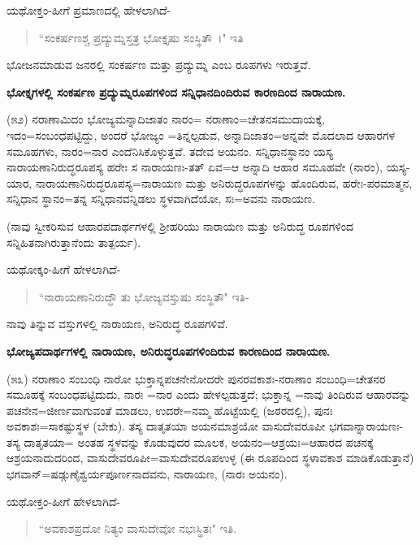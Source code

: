 ಯಥೋಕ್ತಂ-ಹೀಗೆ ಪ್ರಮಾಣದಲ್ಲಿ ಹೇಳಲಾಗಿದೆ-

\begin{verse}
``ಸಂಕರ್ಷಣಶ್ಚ ಪ್ರದ್ಯುಮ್ನಸ್ತತ್ರ ಭೋಕ್ತೃಷು ಸಂಸ್ಥಿತೌ~।" ಇತಿ
\end{verse}

\noindent
ಭೋಜನಮಾಡುವ ಜನರಲ್ಲಿ ಸಂಕರ್ಷಣ ಮತ್ತು ಪ್ರದ್ಯುಮ್ನ ಎಂಬ ರೂಪಗಳು ಇರುತ್ತವೆ.

\begin{center}
\textbf{ಭೋಕ್ತೃಗಳಲ್ಲಿ ಸಂಕರ್ಷಣ ಪ್ರದ್ಯುಮ್ನರೂಪಗಳಿಂದ ಸನ್ನಿಧಾನದಿಂದಿರುವ ಕಾರಣದಿಂದ ನಾರಾಯಣ.}
\end{center}

(೫೨) ನರಾಣಾಮಿದಂ ಭೋಜ್ಯಮನ್ನಾದಿಜಾತಂ ನಾರಂ= ನರಾಣಾಂ=ಚೇತನಸಮುದಾಯಕ್ಕೆ, ಇದಂ=ಸಂಬಂಧಪಟ್ಟಿದ್ದು, ಅಂದರೆ ಭೋಜ್ಯಂ =ತಿನ್ನಲ್ಪಡುವ, ಅನ್ನಾದಿಜಾತಂ=ಅನ್ನವೇ ಮೊದಲಾದ ಆಹಾರಗಳ ಸಮೂಹಗಳು, ನಾರಂ=ನಾರ ಎಂದೆನಿಸಿಕೊಳ್ಳುತ್ತವೆ. ತದೇವ ಅಯನಂ. ಸನ್ನಿಧಾನಸ್ಥಾನಂ ಯಸ್ಯ ನಾರಾಯಣಾನಿರುದ್ಧರೂಪಸ್ಯ ಹರೇಃ ಸ ನಾರಾಯಣಃ-ತತ್ ಏವ=ಆ ಅನ್ನಾದಿ ಆಹಾರ ಸಮೂಹವೇ (ನಾರಂ), ಯಸ್ಯ-ಯಾರ, ನಾರಾಯಣಾನಿರುದ್ಧರೂಪಸ್ಯ=ನಾರಾಯಣ ಮತ್ತು ಅನಿರುದ್ಧರೂಪಗಳನ್ನು ಹೊಂದಿರುವ, ಹರೇಃ-ಪರಮಾತ್ಮನ, ಸನ್ನಿಧಾನ ಸ್ಥಾನಂ=ತನ್ನ ಸನ್ನಿಧಾನವನ್ನಿಡಲು ಸ್ಥಳವಾಗಿದೆಯೋ, ಸಃ=ಅವನು ನಾರಾಯಣ.

(ನಾವು ಸ್ವೀಕರಿಸುವ ಆಹಾರಪದಾರ್ಥಗಳಲ್ಲಿ ಶ‍್ರೀಹರಿಯು ನಾರಾಯಣ ಮತ್ತು ಅನಿರುದ್ಧ ರೂಪಗಳಿಂದ ಸನ್ನಿಹಿತನಾಗಿರುತ್ತಾನೆಂದು ತಾತ್ಪರ್ಯ).

ಯಥೋಕ್ಕಂ-ಹೀಗೆ ಹೇಳಲಾಗಿದೆ-

\begin{verse}
``ನಾರಾಯಣಾನಿರುದ್ಧೌ ತು ಭೋಜ್ಯವಸ್ತುಷು ಸಂಸ್ಥಿತೌ" ಇತಿ-
\end{verse}

\noindent
ನಾವು ತಿನ್ನುವ ವಸ್ತುಗಳಲ್ಲಿ ನಾರಾಯಣ, ಅನಿರುದ್ಧ ರೂಪಗಳಿವೆ.

\begin{center}
\textbf{ಭೋಜ್ಯಪದಾರ್ಥಗಳಲ್ಲಿ ನಾರಾಯಣ, ಅನಿರುದ್ಧರೂಪಗಳಿಂದಿರುವ ಕಾರಣದಿಂದ ನಾರಾಯಣ.}
\end{center}

(೫೩) ನರಾಣಾಂ ಸಂಬಂಧಿ ನಾರೋ ಭುಕ್ತಾನ್ನಪಚನೇನೋದರೇ ಪುನರವಕಾಶಃ-ನರಾಣಾಂ ಸಂಬಂಧಿ=ಚೇತನರ ಸಮೂಹಕ್ಕೆ ಸಂಬಂಧಪಟ್ಟಿದುದು, ನಾರಃ =ನಾರ ಎಂದು ಹೇಳಲ್ಪಡುತ್ತದೆ; ಭುಕ್ತಾನ್ನ =ನಾವು ತಿಂದಿರುವ ಆಹಾರವನ್ನು ಪಚನೇನ=ಜೀರ್ಣವಾಗುವಂತೆ ಮಾಡಲು, ಉದರೇ=ನಮ್ಮ ಹೊಟ್ಟೆಯಲ್ಲಿ (ಜಠರದಲ್ಲಿ), ಪುನಃ ಅವಕಾಶಃ=ಸಾಕಷ್ಟುಸ್ಥಳ (ಬೇಕು). ತಸ್ಯ ದಾತೃತಯಾ ಅಯನಮಾಶ್ರಯೋ ವಾಸುದೇವರೂಪೀ ಭಗವಾನ್ನಾರಾಯಣಃ-ತಸ್ಯ ದಾತೃತಯಾ= ಅಂತಹ ಸ್ಥಳವನ್ನು ಕೊಡುವುದರ ಮೂಲಕ, ಅಯನಂ=ಆಶ್ರಯಃ=ಆಹಾರದ ಪಚನಕ್ಕೆ ಆಶ್ರಯನಾದುದರಿಂದ, ವಾಸುದೇವರೂಪೀ=ವಾಸುದೇವರೂಪಉಳ್ಳ (ಈ ರೂಪದಿಂದ ಸ್ಥಳಾವಕಾಶ ಮಾಡಿಕೊಡುತ್ತಾನೆ) ಭಗವಾನ್=ಷಡ್ಗುಣೈಶ್ವರ್ಯಪೂರ್ಣನಾದವನು, ನಾರಾಯಣ, (ನಾರಃ ಅಯನಂ).

ಯಥೋಕ್ತಂ-ಹೀಗೆ ಹೇಳಲಾಗಿದೆ-

\begin{verse}
``ಅವಕಾಶಪ್ರದೋ ನಿತ್ಯಂ ವಾಸುದೇವೋ ನಭಃಸ್ಥಿತಃ" ಇತಿ.
\end{verse}

